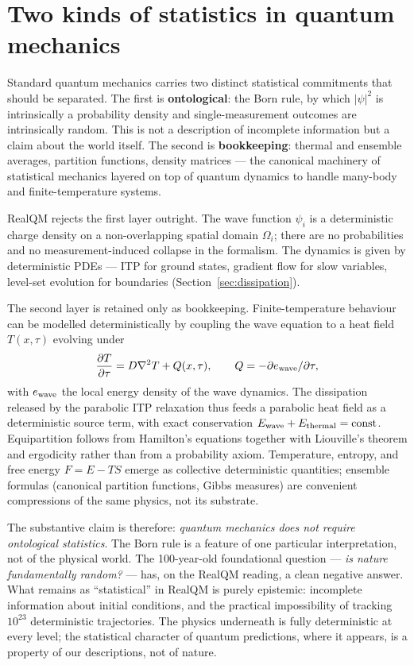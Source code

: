 \documentclass[11pt]{article}
\begin{document}
\section{Two kinds of statistics in quantum mechanics}\label{sec:statistics}

Standard quantum mechanics carries two distinct statistical commitments that should be separated. The first is \textbf{ontological}: the Born rule, by which $|\psi|^2$ is intrinsically a probability density and single-measurement outcomes are intrinsically random. This is not a description of incomplete information but a claim about the world itself. The second is \textbf{bookkeeping}: thermal and ensemble averages, partition functions, density matrices --- the canonical machinery of statistical mechanics layered on top of quantum dynamics to handle many-body and finite-temperature systems.

RealQM rejects the first layer outright. The wave function $\psi_i$ is a deterministic charge density on a non-overlapping spatial domain $\Omega_i$; there are no probabilities and no measurement-induced collapse in the formalism. The dynamics is given by deterministic PDEs --- ITP for ground states, gradient flow for slow variables, level-set evolution for boundaries (Section~\ref{sec:dissipation}).

The second layer is retained only as bookkeeping. Finite-temperature behaviour can be modelled deterministically by coupling the wave equation to a heat field $T(x,\tau)$ evolving under
\begin{equation}
\frac{\partial T}{\partial \tau} = D \nabla^2 T + Q(x,\tau), \qquad Q = -\partial e_{\rm wave}/\partial \tau,
\end{equation}
with $e_{\rm wave}$ the local energy density of the wave dynamics. The dissipation released by the parabolic ITP relaxation thus feeds a parabolic heat field as a deterministic source term, with exact conservation $E_{\rm wave} + E_{\rm thermal} = \text{const}$. Equipartition follows from Hamilton's equations together with Liouville's theorem and ergodicity rather than from a probability axiom. Temperature, entropy, and free energy $F = E - TS$ emerge as collective deterministic quantities; ensemble formulas (canonical partition functions, Gibbs measures) are convenient compressions of the same physics, not its substrate.

The substantive claim is therefore: \emph{quantum mechanics does not require ontological statistics}. The Born rule is a feature of one particular interpretation, not of the physical world. The 100-year-old foundational question --- \emph{is nature fundamentally random?} --- has, on the RealQM reading, a clean negative answer. What remains as ``statistical'' in RealQM is purely epistemic: incomplete information about initial conditions, and the practical impossibility of tracking $10^{23}$ deterministic trajectories. The physics underneath is fully deterministic at every level; the statistical character of quantum predictions, where it appears, is a property of our descriptions, not of nature.
\end{document}

